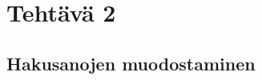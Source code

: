 \documentclass{article}
\author{Ville Kumpulainen}
\begin{document}
\section*{Tehtävä 2}
\subsection*{Hakusanojen muodostaminen}

\end{document}
